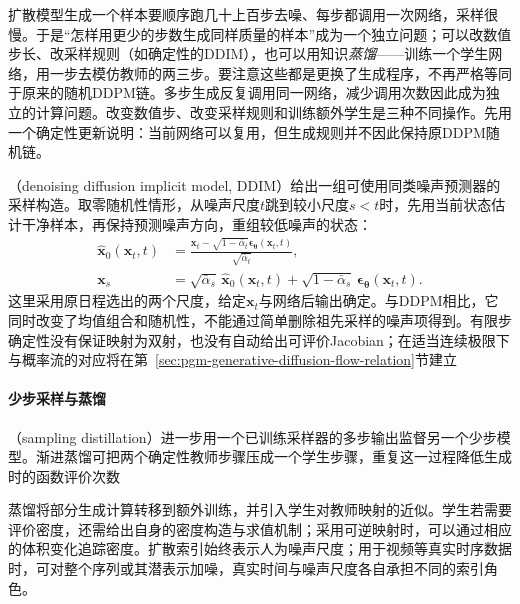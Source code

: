 \label{sec:pgm-generative-diffusion-computation}

扩散模型生成一个样本要顺序跑几十上百步去噪、每步都调用一次网络，采样很慢。于是“怎样用更少的步数生成同样质量的样本”成为一个独立问题；可以改数值步长、改采样规则（如确定性的DDIM），也可以用知识\emph{蒸馏}——训练一个学生网络，用一步去模仿教师的两三步。要注意这些都是更换了生成程序，不再严格等同于原来的随机DDPM链。多步生成反复调用同一网络，减少调用次数因此成为独立的计算问题。改变数值步、改变采样规则和训练额外学生是三种不同操作。先用一个确定性更新说明：当前网络可以复用，但生成规则并不因此保持原DDPM随机链。

（denoising diffusion implicit model, DDIM）给出一组可使用同类噪声预测器的采样构造。取零随机性情形，从噪声尺度$t$跳到较小尺度$s<t$时，先用当前状态估计干净样本，再保持预测噪声方向，重组较低噪声的状态：
\begin{equation}
  \label{eq:pgm-generative-ddim-update}
  \begin{aligned}
    \widehat{\bm x}_0(\bm x_t,t)
      &=\frac{\bm x_t-\sqrt{1-\bar\alpha_t}
                 \bm\epsilon_{\bm\theta}(\bm x_t,t)}
                    {\sqrt{\bar\alpha_t}},\\
    \bm x_s
      &=\sqrt{\bar\alpha_s}\,\widehat{\bm x}_0(\bm x_t,t)
        +\sqrt{1-\bar\alpha_s}\,
                    \bm\epsilon_{\bm\theta}(\bm x_t,t).
  \end{aligned}
\end{equation}
这里采用原日程选出的两个尺度，给定$\bm x_t$与网络后输出确定。与DDPM相比，它同时改变了均值组合和随机性，不能通过简单删除祖先采样的噪声项得到。有限步确定性没有保证映射为双射，也没有自动给出可评价Jacobian；在适当连续极限下与概率流的对应将在第~\ref{sec:pgm-generative-diffusion-flow-relation}节建立

\paragraph{少步采样与蒸馏}

（sampling distillation）进一步用一个已训练采样器的多步输出监督另一个少步模型。渐进蒸馏可把两个确定性教师步骤压成一个学生步骤，重复这一过程降低生成时的函数评价次数

蒸馏将部分生成计算转移到额外训练，并引入学生对教师映射的近似。学生若需要评价密度，还需给出自身的密度构造与求值机制；采用可逆映射时，可以通过相应的体积变化追踪密度。扩散索引始终表示人为噪声尺度；用于视频等真实时序数据时，可对整个序列或其潜表示加噪，真实时间与噪声尺度各自承担不同的索引角色。

